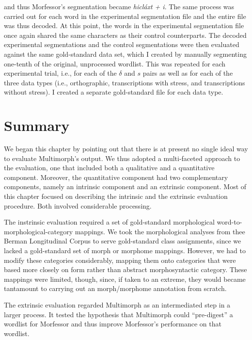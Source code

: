 {and thus Morfessor's segmentation became \textit{hicl\'{a}xt + i}.
The same process was carried out for each word in the experimental segmentation file and the entire file was thus decoded. At this point, the words in the experimental segmentation file once again shared the same characters as their control counterparts.
The decoded experimental segmentations and the control segmentations were then evaluated against the same gold-standard data set, which I created by manually segmenting 
one-tenth of the original, unprocessed wordlist. 
This was repeated for each experimental trial, i.e., for each of the $\delta$ and $s$ 
pairs as well as for each of the three data types (i.e., orthographic, transcriptions with stress, 
and transcriptions without stress).
I created a separate gold-standard file for each data type.

\section{Summary}
We began this chapter by pointing out that there is at present no single ideal way to evaluate Multimorph's output.
We thus adopted a multi-faceted approach to the evaluation, one that included both a qualitative and
a quantitative component. Moreover, the quantitative component had two complementary components, namely an intrinsic component and an extrinsic component. Most of this chapter focused on describing the intrinsic and the extrinsic evaluation procedure. Both involved considerable processing. 

The instrinsic evaluation required a set of gold-standard morphological word-to-morphological-category mappings. We took the morphological analyses from thee Berman Longitudinal Corpus to serve gold-standard class assignments, since we lacked a gold-standard set of morph or morphome mappings. However, we had to modify these categories considerably, mapping them onto categories that were based more closely on form rather than abstract morphosyntactic category. These mappings were limited, though, since, if taken to an extreme, they would became tantamount to carrying out an morph/morphome annotation from scratch.

The extrinsic evaluation regarded Multimorph as an intermediated step in a larger process. It tested the hypothesis that Multimorph could ``pre-digest'' a wordlist for Morfessor and thus improve Morfessor's performance on that
wordlist.

}
